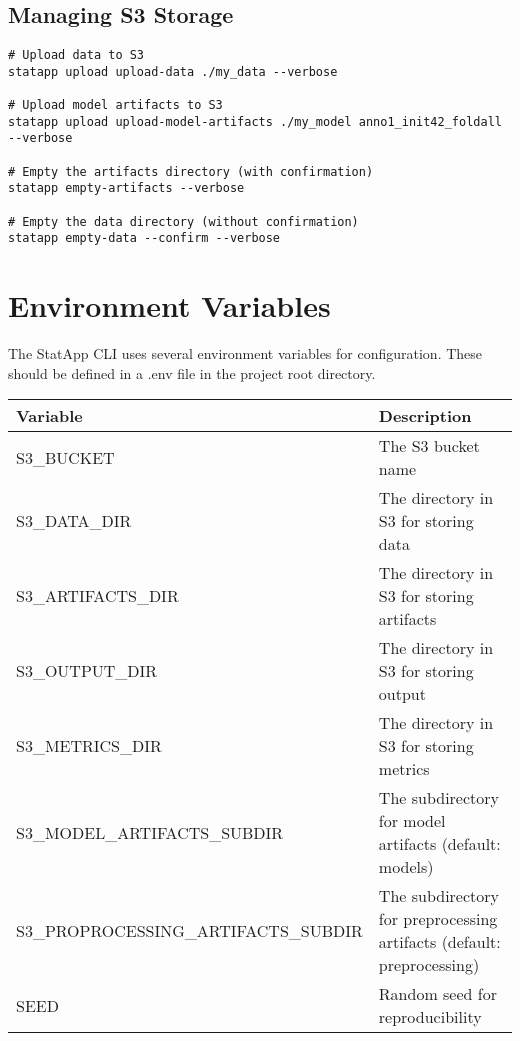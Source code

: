 \documentclass{article}
\begin{document}
\subsection{Managing S3 Storage}
\begin{lstlisting}
# Upload data to S3
statapp upload upload-data ./my_data --verbose

# Upload model artifacts to S3
statapp upload upload-model-artifacts ./my_model anno1_init42_foldall --verbose

# Empty the artifacts directory (with confirmation)
statapp empty-artifacts --verbose

# Empty the data directory (without confirmation)
statapp empty-data --confirm --verbose
\end{lstlisting}

\section{Environment Variables}
The StatApp CLI uses several environment variables for configuration. These should be defined in a .env file in the project root directory.

\begin{tabulary}{\linewidth}{LL}
\toprule
\textbf{Variable} & \textbf{Description} \\
\midrule
S3\_BUCKET & The S3 bucket name \\
S3\_DATA\_DIR & The directory in S3 for storing data \\
S3\_ARTIFACTS\_DIR & The directory in S3 for storing artifacts \\
S3\_OUTPUT\_DIR & The directory in S3 for storing output \\
S3\_METRICS\_DIR & The directory in S3 for storing metrics \\
S3\_MODEL\_ARTIFACTS\_SUBDIR & The subdirectory for model artifacts (default: models) \\
S3\_PROPROCESSING\_ARTIFACTS\_SUBDIR & The subdirectory for preprocessing artifacts (default: preprocessing) \\
SEED & Random seed for reproducibility \\
\bottomrule
\end{tabulary}
\end{document}
